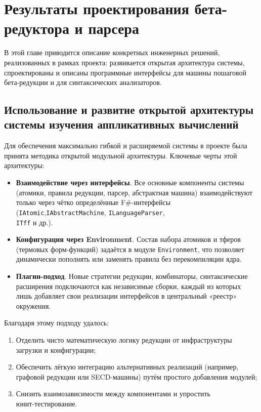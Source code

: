 \chapter{Результаты проектирования бета-редуктора и парсера}
\label{chapter3}

В этой главе приводится описание конкретных инженерных решений, реализованных в рамках проекта: развивается открытая архитектура системы, спроектированы и описаны программные интерфейсы для машины пошаговой бета‑редукции и для синтаксических анализаторов.

\section{Использование и развитие открытой архитектуры системы изучения аппликативных вычислений}
\label{sec:open-architecture}

Для обеспечения максимально гибкой и расширяемой системы в проекте была принята методика открытой модульной архитектуры.  
Ключевые черты этой архитектуры:
\begin{itemize}
  \item \textbf{Взаимодействие через интерфейсы}. Все основные компоненты системы (атомики, правила редукции, парсер, абстрактная машина) взаимодействуют только через чётко определённые F\#-интерфейсы (\texttt{IAtomic},\texttt{IAbstractMachine}, \texttt{ILanguageParser},\\\texttt{ITff}  и др.).
  \item \textbf{Конфигурация через Environment}. Состав набора атомиков и тферов (термовых форм-функций) задаётся в модуле \texttt{Environment}, что позволяет динамически пополнять или заменять правила без перекомпиляции ядра.
  \item \textbf{Плагин-подход}. Новые стратегии редукции, комбинаторы, синтаксические расширения подключаются как независимые сборки, каждый из которых лишь добавляет свои реализации интерфейсов в центральный «реестр» окружения.
\end{itemize}

Благодаря этому подходу удалось:
\begin{enumerate}
  \item Отделить чисто математическую логику редукции от инфраструктуры загрузки и конфигурации;
  \item Обеспечить лёгкую интеграцию альтернативных реализаций (например, графовой редукции или SECD‑машины) путём простого добавления модулей;
  \item Снизить взаимозависимости между компонентами и упростить юнит‑тестирование.
\end{enumerate}

